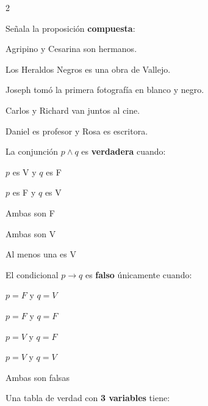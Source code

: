 	\begin{multicols}{2}
		\setcounter{numejercicio}{0}
		
		\ejercicio Señala la proposición \textbf{compuesta}:
		
		\begin{alternativas}
			\item Agripino y Cesarina son hermanos.
			\item Los Heraldos Negros es una obra de Vallejo.
			\item Joseph tomó la primera fotografía en blanco y negro.
			\item Carlos y Richard van juntos al cine.
			\item Daniel es profesor y Rosa es escritora.
		\end{alternativas}
		\vspace{0.3cm}
		
		\ejercicio La conjunción $p \wedge q$ es \textbf{verdadera} cuando:
		
		\begin{alternativas}
			\item $p$ es V y $q$ es F
			\item $p$ es F y $q$ es V
			\item Ambas son F
			\item Ambas son V
			\item Al menos una es V
		\end{alternativas}
		\vspace{0.3cm}
		
		\ejercicio El condicional $p \to q$ es \textbf{falso} únicamente cuando:
		
		\begin{alternativas}
			\item $p = F$ y $q = V$
			\item $p = F$ y $q = F$
			\item $p = V$ y $q = F$
			\item $p = V$ y $q = V$
			\item Ambas son falsas
		\end{alternativas}
		\vspace{0.3cm}
		
		\ejercicio Una tabla de verdad con \textbf{3 variables} tiene:
		

\end{multicols}
